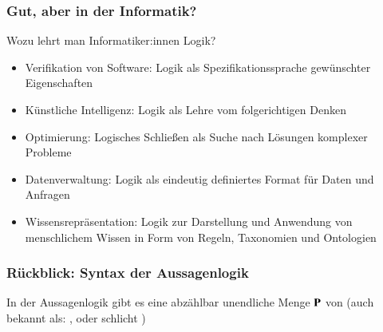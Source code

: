 \documentclass[aspectratio=1610,onlymath]{beamer}
\begin{document}
\begin{frame}\frametitle{Gut, aber in der Informatik?}

Wozu lehrt man Informatiker:innen Logik?
\begin{itemize}
\item \alert{Verifikation von Software:} Logik als Spezifikationssprache gewünschter Eigenschaften
\item \alert{Künstliche Intelligenz:} Logik als Lehre vom folgerichtigen Denken
\item \alert{Optimierung:} Logisches Schließen als Suche nach Lösungen komplexer Probleme
\item \alert{Datenverwaltung:} Logik als eindeutig definiertes Format für Daten und Anfragen
\item \alert{Wissensrepräsentation:} Logik zur Darstellung und Anwendung von menschlichem Wissen in Form von Regeln, Taxonomien und Ontologien
\end{itemize}

\end{frame}

\begin{frame}\frametitle{Rückblick: Syntax der Aussagenlogik}

In der Aussagenlogik gibt es eine abzählbar unendliche Menge $\textbf{\textcolor{black}{P}}$ von
 (auch bekannt als: ,  oder schlicht )
\medskip


\end{frame}
\end{document}

